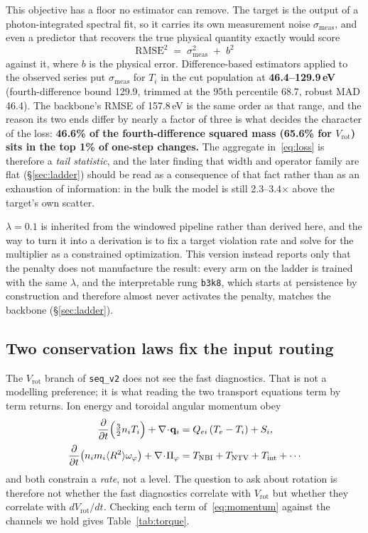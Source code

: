 \documentclass[10pt]{article}
\newcommand{\Ti}{\ensuremath{T_i}}
\newcommand{\Vrot}{\ensuremath{V_\mathrm{rot}}}
\newcommand{\seqv}{\texttt{seq\_v2}}
\newcommand{\bthree}{\texttt{b3k8}}
\begin{document}
This objective has a floor no estimator can remove. The target is the output of a
photon-integrated spectral fit, so it carries its own measurement noise
$\sigma_\mathrm{meas}$, and even a predictor that recovers the true physical
quantity exactly would score
%
\begin{equation}
  \mathrm{RMSE}^2 \;=\; \sigma_\mathrm{meas}^2 \;+\; b^2
  \label{eq:floor}
\end{equation}
%
against it, where $b$ is the physical error. Difference-based estimators applied to
the observed series put $\sigma_\mathrm{meas}$ for \Ti{} in the cut population at
\textbf{46.4--129.9\,eV} (fourth-difference bound 129.9, trimmed at the 95th
percentile 68.7, robust MAD 46.4). The backbone's RMSE of 157.8\,eV is the same
order as that range, and the reason its two ends differ by nearly a factor of three
is what decides the character of the loss: \textbf{46.6\% of the fourth-difference
squared mass (65.6\% for \Vrot{}) sits in the top 1\% of one-step changes.} The
aggregate in~\eqref{eq:loss} is therefore a \emph{tail statistic}, and the later
finding that width and operator family are flat (\S\ref{sec:ladder}) should be read
as a consequence of that fact rather than as an exhaustion of information: in the
bulk the model is still 2.3--3.4$\times$ above the target's own scatter.

$\lambda=0.1$ is inherited from the windowed pipeline rather than derived here, and
the way to turn it into a derivation is to fix a target violation rate and solve for
the multiplier as a constrained optimization. This version instead reports only that
the penalty does not manufacture the result: every arm on the ladder is trained with
the same $\lambda$, and the interpretable rung \bthree{}, which starts at
persistence by construction and therefore almost never activates the penalty, matches
the backbone (\S\ref{sec:ladder}).

\subsection{Two conservation laws fix the input routing}
\label{sec:model:physics}

The \Vrot{} branch of \seqv{} does not see the fast diagnostics. That is not a
modelling preference; it is what reading the two transport equations term by term
returns. Ion energy and toroidal angular momentum obey
%
\begin{align}
  \frac{\partial}{\partial t}\Bigl(\tfrac{3}{2}n_i T_i\Bigr) + \nabla\!\cdot\!\mathbf{q}_i
    &= Q_{ei}\,(T_e-T_i) + S_i,
  \label{eq:energy}\\[2pt]
  \frac{\partial}{\partial t}\bigl(n_i m_i \langle R^2\rangle \omega_\varphi\bigr)
    + \nabla\!\cdot\!\Pi_\varphi
    &= T_\mathrm{NBI} + T_\mathrm{NTV} + T_\mathrm{int} + \cdots
  \label{eq:momentum}
\end{align}
%
and both constrain a \emph{rate}, not a level. The question to ask about rotation is
therefore not whether the fast diagnostics correlate with \Vrot{} but whether they
correlate with $d\Vrot/dt$. Checking each term of~\eqref{eq:momentum} against the
channels we hold gives Table~\ref{tab:torque}.
\end{document}
